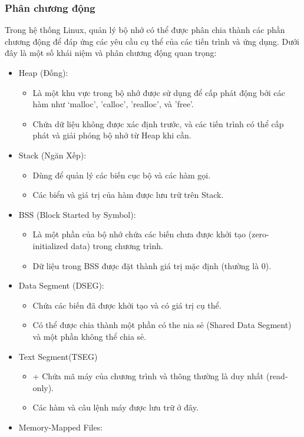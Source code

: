 \documentclass[12pt,a4paper]{article}
\begin{document}
\subsubsection{Phân chương động}
Trong hệ thống Linux, quản lý bộ nhớ có thể được phân chia thành các phần chương động để đáp ứng các yêu cầu cụ thể của các tiến trình và ứng dụng. Dưới đây là một số khái niệm và phân chương động quan trọng:
\begin{itemize}
	\item Heap (Đống):
	\begin{itemize}
		\item Là một khu vực trong bộ nhớ được sử dụng để cấp phát động bởi các hàm như `malloc', 'calloc', 'realloc', và 'free'.
		\item Chứa dữ liệu không được xác định trước, và các tiến trình có thể cấp phát và giải phóng bộ nhớ từ Heap khi cần.
	\end{itemize}
	\item Stack (Ngăn Xếp):
	\begin{itemize}
		\item Dùng để quản lý các biến cục bộ và các hàm gọi.
		\item Các biển và giá trị của hàm được lưu trữ trên Stack.
	\end{itemize}
	\item BSS (Block Started by Symbol):
	\begin{itemize}
		\item Là một phần của bộ nhớ chứa các biến chưa được khởi tạo (zero-initialized data) trong chương trình.
		\item Dữ liệu trong BSS được đặt thành giá trị mặc định (thường là 0).
	\end{itemize}
	\item Data Segment (DSEG):
	\begin{itemize}
		\item Chứa các biến đã được khởi tạo và có giá trị cụ thể.
		\item Có thể được chia thành một phần có the nia sẻ (Shared Data Segment) và một phần không thể chia sẻ.
	\end{itemize}
	\item Text Segment(TSEG)
	\begin{itemize}
		\item + Chứa mã máy của chương trình và thông thường là duy nhất (read-only).
		\item Các hàm và câu lệnh máy được lưu trữ ở đây.
	\end{itemize}
	\item Memory-Mapped Files:

\end{itemize}
\end{document}
